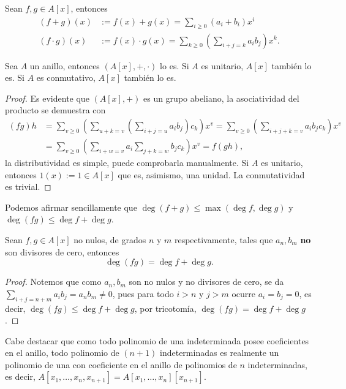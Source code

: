 \documentclass[11pt,oneside]{book}
\begin{document}
Sean $f,g\in A[x]$, entonces
\begin{align*}
(f+g)(x)&:=f(x)+g(x)=\sum_{i\geq 0}(a_i+b_i)x^i\\
(f\cdot g)(x)&:=f(x)\cdot g(x)=\sum_{k\geq 0}\left(\sum_{i+j=k}a_ib_j\right)x^k.
\end{align*}
\begin{thm}
Sea $A$ un anillo, entonces $(A[x],+,\cdot)$ lo es. Si $A$ es unitario, $A[x]$ también lo es. Si $A$ es conmutativo, $A[x]$ también lo es.
\end{thm}
\begin{proof}
Es evidente que $(A[x],+)$ es un grupo abeliano, la asociatividad del producto se demuestra con
\begin{align*}
(fg)h&=\sum_{v\geq 0}\left(\sum_{u+k=v}\left(\sum_{i+j=u}a_ib_j\right)c_k\right)x^v=\sum_{v\geq 0}\left(\sum_{i+j+k=v}a_ib_jc_k\right)x^v\\
&=\sum_{v\geq 0}\left(\sum_{i+w=v}a_i\sum_{j+k=w}b_jc_k\right)x^v=f(gh),
\end{align*}
la distributividad es simple, puede comprobarla manualmente. Si $A$ es unitario, entonces $1(x):=1\in A[x]$ que es, asimismo, una unidad. La conmutatividad es trivial.
\end{proof}
Podemos afirmar sencillamente que $\deg(f+g)\leq\max(\deg f,\deg g)$ y $\deg(fg)\leq\deg f+\deg g$.
\begin{thm}\label{thm:degree-product-polinomial}
Sean $f,g\in A[x]$ no nulos, de grados $n$ y $m$ respectivamente, tales que $a_n,b_m$ \textbf{no} son divisores de cero, entonces
$$\deg(fg)=\deg f+\deg g.$$
\end{thm}
\begin{proof}
Notemos que como $a_n,b_m$ son no nulos y no divisores de cero, se da $\sum_{i+j=n+m}a_ib_j=a_nb_m\neq 0$, pues para todo $i\gt n$ y $j\gt m$ ocurre $a_i=b_j=0$, es decir, $\deg(fg)\leq\deg f+\deg g$, por tricotomía, $\deg(fg)=\deg f+\deg g$.
\end{proof}
Cabe destacar que como todo polinomio de una indeterminada posee coeficientes en el anillo, todo polinomio de $(n+1)$ indeterminadas es realmente un polinomio de una con coeficiente en el anillo de polinomios de $n$ indeterminadas, es decir, $A[x_1,\dots,x_n,x_{n+1}]=A[x_1,\dots,x_n][x_{n+1}]$.
\end{document}
